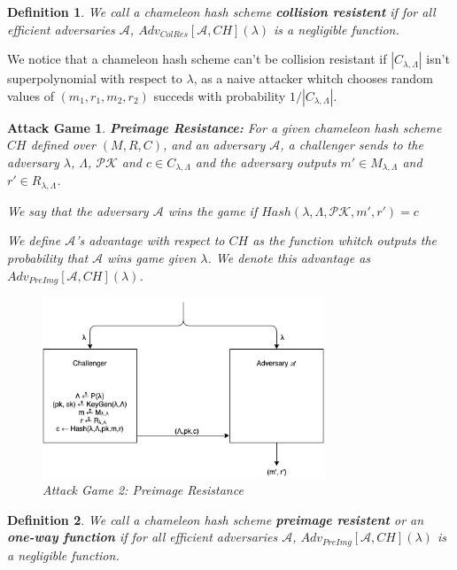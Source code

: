 \documentclass[a4paper]{article}
\newtheorem{definicao}{Definition}
\newtheorem{game}{Attack Game}
\begin{document}
    \begin{definicao}
    We call a chameleon hash scheme \textbf{collision resistent} if for
    all efficient adversaries $\mathcal{A}$,
    $Adv_{ColRes}[\mathcal{A},CH](\lambda)$ is a negligible
    function.
    \end{definicao}
    
    We notice that a chameleon hash scheme can't be collision resistant if
    $|C_{\lambda,\Lambda}|$ isn't superpolynomial with respect to
    $\lambda$, as
    a naive attacker whitch chooses random values of $(m_1, r_1, m_2,
    r_2)$ succeds with probability $1/|C_{\lambda,\Lambda}|$.
    
    \begin{game}
    \textbf{Preimage Resistance: }For a given chameleon hash scheme $CH$
    defined over $(M, R, C)$, and an adversary $\mathcal{A}$,
    a challenger sends to the adversary $\lambda$, $\Lambda$,
    $\mathcal{PK}$ and $c \in C_{\lambda,\Lambda}$ and the adversary
    outputs $m' \in M_{\lambda,\Lambda}$ and $r' \in R_{\lambda,\Lambda}$.
    
    We say that the adversary $\mathcal{A}$ wins the game if
    $Hash(\lambda, \Lambda, \mathcal{PK}, m', r') = c$
    
    We define $\mathcal{A}$'s advantage with respect to $CH$ as the
    function whitch outputs the probability that $\mathcal{A}$ wins 
    game given $\lambda$. We denote this advantage as
    $Adv_{PreImg}[\mathcal{A},CH](\lambda)$.
    
    \begin{figure}
      \centering
          \includegraphics[width=0.75\textwidth]{imagens/preimage.png}
      \caption{Attack Game 2: Preimage Resistance}
    \end{figure}
    \end{game}
    
    \begin{definicao}
    We call a chameleon hash scheme \textbf{preimage resistent} 
    or an \textbf{one-way function} if for all efficient adversaries
    $\mathcal{A}$, $Adv_{PreImg}[\mathcal{A},CH](\lambda)$ is a negligible
    function.
    \end{definicao}
    
\end{document}
